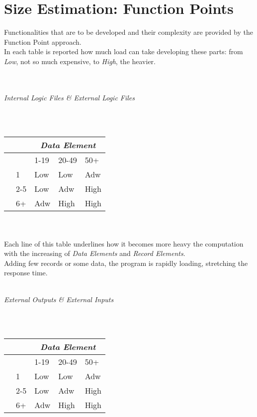 \documentclass[11pt,a4paper]{report}
\begin{document}
\section{Size Estimation: Function Points}
Functionalities that are to be developed and their complexity are provided by the Function Point approach.\\In each table is reported how much load can take developing these parts: from \textit{Low}, not so much expensive, to \textit{High}, the heavier.\\
\\
\\
\centerline{\textit{Internal Logic Files \& External Logic Files}}
\\\\
\begin{tabularx}{\textwidth}{|p{1cm}|X|X|X|X|}
	\hline
	\multicolumn{2}{|X|}{} & \multicolumn{3}{c|}{\textit{Data Element}}\\
	\hline
 	 \multirow{1}{*}{}& & 1-19 & 20-49 & 50+\\ \cline{2-5}	
	 \multirow{3}{*}{\rotatebox[origin=c]{90}{\parbox{10mm}{Record\\Elements}}}  & 1 & Low & Low & Adw\\
	 & 2-5 & Low & Adw & High\\
	 & 6+ & Adw & High & High\\
	\hline
\end{tabularx}
\\\\
Each line of this table underlines how it becomes more heavy the computation with the increasing of \textit{Data Elements} and \textit{Record Elements}.\\
Adding few records or some data, the program is rapidly loading, stretching the response time.
\\\\
\centerline{\textit{External Outputs \& External Inputs}}
\\\\
\begin{tabularx}{\textwidth}{|p{1cm}|X|X|X|X|}
	\hline
	\multicolumn{2}{|X|}{} & \multicolumn{3}{c|}{\textit{Data Element}}\\
	\hline
	\multirow{1}{*}{}& & 1-19 & 20-49 & 50+\\ \cline{2-5}	
	\multirow{3}{*}{\rotatebox[origin=c]{90}{\parbox{10mm}{Record\\Elements}}}  & 1 & Low & Low & Adw\\
	& 2-5 & Low & Adw & High\\
	& 6+ & Adw & High & High\\
	\hline
\end{tabularx}
\end{document}
